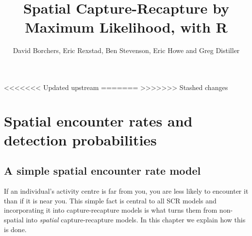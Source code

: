 \documentclass[graybox,envcountchap,sectrefs]{SpringerStyleFiles/styles/svmono}\usepackage[]{graphicx}\usepackage[]{color}
\begin{document}

\author{David Borchers, Eric Rexstad, Ben Stevenson, Eric Howe and Greg Distiller}
\title{Spatial Capture-Recapture by Maximum Likelihood, with R}
\maketitle

\frontmatter%


\tableofcontents



\mainmatter%

<<<<<<< Updated upstream
=======
>>>>>>> Stashed changes



\chapter{Spatial encounter rates and detection probabilities}
\label{chap:ER+detfun}


\section{A simple spatial encounter rate model}
\label{sec:ER+detfun.simple.ER.model}

If an individual's activity centre is far from you, you are less likely to encounter it than if it is near you. This simple fact is central to all SCR models and incorporating it into capture-recapture models is what turns them from non-spatial into \textit{spatial} capture-recapture models. In this chapter we explain how this is done. 
\end{document}
